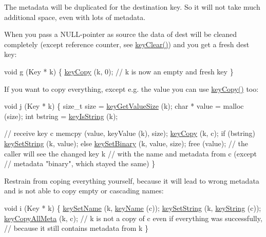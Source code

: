The metadata will be duplicated for the destination key. So it will not take much additional space, even with lots of metadata.

When you pass a N\+U\+L\+L-\/pointer as source the data of dest will be cleaned completely (except reference counter, see \hyperlink{group__key_gab2242311a36bbc0520e0d36895107ec1}{key\+Clear()}) and you get a fresh dest key\+:


\begin{DoxyCodeInclude}
\textcolor{keywordtype}{void} g (Key * k)
\{
        \hyperlink{group__key_ga6a12cbbe656a1ad9f41b8c681d7a2f92}{keyCopy} (k, 0);
        \textcolor{comment}{// k is now an empty and fresh key}
\}
\end{DoxyCodeInclude}
 If you want to copy everything, except e.\+g. the value you can use \hyperlink{group__key_ga6a12cbbe656a1ad9f41b8c681d7a2f92}{key\+Copy()} too\+:


\begin{DoxyCodeInclude}
\textcolor{keywordtype}{void} j (Key * k)
\{
        \textcolor{keywordtype}{size\_t} size = \hyperlink{group__keyvalue_gae326672fffb7474abfe9baf53b73217e}{keyGetValueSize} (k);
        \textcolor{keywordtype}{char} * value = malloc (size);
        \textcolor{keywordtype}{int} bstring = \hyperlink{group__keytest_gaea7670778abd07fee0fe8ac12a149190}{keyIsString} (k);

        \textcolor{comment}{// receive key c}
        memcpy (value, keyValue (k), size);
        \hyperlink{group__key_ga6a12cbbe656a1ad9f41b8c681d7a2f92}{keyCopy} (k, c);
        \textcolor{keywordflow}{if} (bstring)
                \hyperlink{group__keyvalue_ga622bde1eb0e0c4994728331326340ef2}{keySetString} (k, value);
        \textcolor{keywordflow}{else}
                \hyperlink{group__keyvalue_gaa50a5358fd328d373a45f395fa1b99e7}{keySetBinary} (k, value, size);
        free (value);
        \textcolor{comment}{// the caller will see the changed key k}
        \textcolor{comment}{// with the name and metadata from c (except}
        \textcolor{comment}{// metadata "binary", which stayed the same)}
\}
\end{DoxyCodeInclude}
 Restrain from coping everything yourself, because it will lead to wrong metadata and is not able to copy empty or cascading names\+:


\begin{DoxyCodeInclude}
\textcolor{keywordtype}{void} i (Key * k)
\{
        \hyperlink{group__keyname_ga7699091610e7f3f43d2949514a4b35d9}{keySetName} (k, \hyperlink{group__keyname_ga8e805c726a60da921d3736cda7813513}{keyName} (c));
        \hyperlink{group__keyvalue_ga622bde1eb0e0c4994728331326340ef2}{keySetString} (k, \hyperlink{group__keyvalue_ga880936f2481d28e6e2acbe7486a21d05}{keyString} (c));
        \hyperlink{group__keymeta_ga8e63720a65610a29597494d0671f9401}{keyCopyAllMeta} (k, c);
        \textcolor{comment}{// k is not a copy of c even if everything was successfully,}
        \textcolor{comment}{// because it still contains metadata from k}
\}
\end{DoxyCodeInclude}




